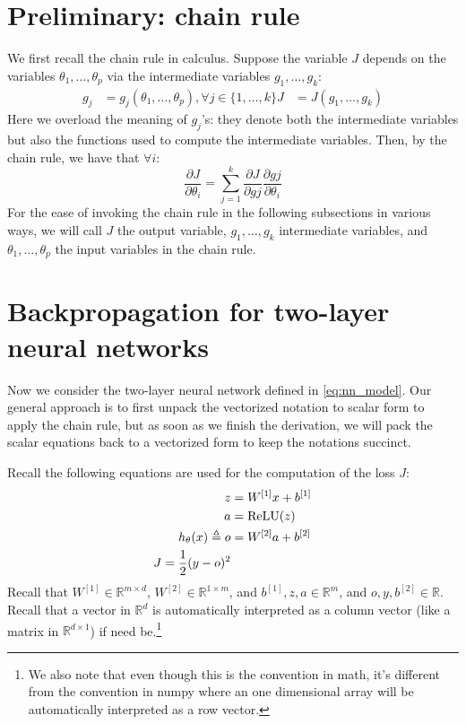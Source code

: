 \section{Preliminary: chain rule}
We first recall the chain rule in calculus. Suppose the variable $J$ depends on
the variables $\theta_{1},\ldots,\theta_p$ via the intermediate variables $g_1,\ldots,g_k$:
\begin{align}
    g_j &= g_j (\theta_{1} ,\ldots,\theta_p ),\forall j \in \{1, \ldots ,k\}
    J &= J(g_1,\ldots,g_k)
\end{align}
Here we overload the meaning of $g_j$'s: they denote both the intermediate
variables but also the functions used to compute the intermediate variables.
Then, by the chain rule, we have that $\forall i$:
\begin{equation}
    \frac{\partial J}{\partial \theta_i} = \sum_{j=1}^k \frac{\partial J}{\partial g j}\frac{\partial g j}{\partial \theta_i}\label{eq:chain_rule}
\end{equation}
For the ease of invoking the chain rule in the following subsections in various
ways, we will call $J$ the output variable, $g_1 ,\ldots,g_k$ intermediate variables,
and $\theta_{1} ,\ldots,\theta_p$ the input variables in the chain rule.

\section{Backpropagation for two-layer neural networks}
Now we consider the two-layer neural network defined in \cref{eq:nn_model}.
Our general approach is to first unpack the vectorized notation to scalar
form to apply the chain rule, but as soon as we finish the derivation, we will
pack the scalar equations back to a vectorized form to keep the notations
succinct.

Recall the following equations are used for the computation of the loss $J$:
\begin{align}
    z &= W^{[1]}x + b^{[1]}\\
    a &= \operatorname{ReLU}(z)\\
    h_\theta(x) \triangleq o &= W^{[2]}a + b^{[2]}\\
    J = \frac{1}{2} (y - o)^2
\end{align}
Recall that $W^{[1]} \in \mathbb{R}^{m \times d}$, $W^{[2]} \in \mathbb{R}^{1 \times m}$, and $b^{[1]},z,a \in \mathbb{R}^m$, and $o,y,b^{[2]} \in \mathbb{R}$.
Recall that a vector in $\mathbb R^d$ is automatically interpreted as a column vector
(like a matrix in $\mathbb R^{d \times 1}$) if need be.\footnote{
We also note that even though this is the convention in math, it's different from the
convention in numpy where an one dimensional array will be automatically interpreted as
a row vector.}


